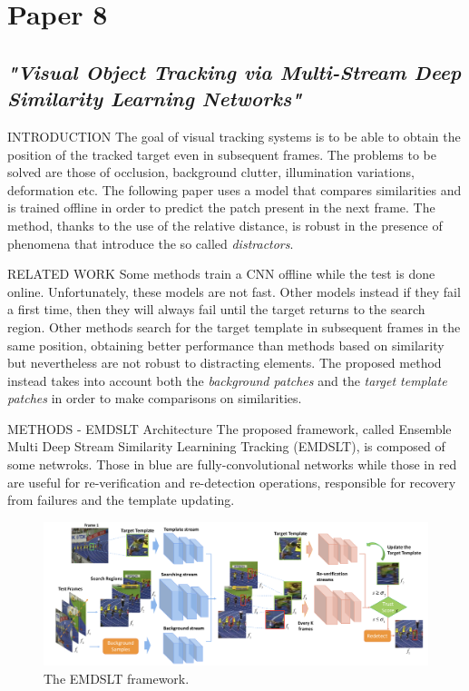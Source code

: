\section{Paper 8}
\subsection{\emph{"Visual Object Tracking via Multi-Stream Deep Similarity Learning Networks"}}

\begin{frame}{INTRODUCTION}
    The goal of visual tracking systems is to be able to obtain the position of 
    the tracked target even in subsequent frames. The problems to be solved 
    are those of occlusion, background clutter, illumination variations, 
    deformation etc. The following paper uses a model that compares 
    similarities and is trained offline in order to predict the patch present in 
    the next frame. The method, thanks to the use of the relative distance, 
    is robust in the presence of phenomena that introduce the so called 
    \emph{distractors}.
\end{frame}

\begin{frame}{RELATED WORK}
    Some methods train a CNN offline while the test is done online. Unfortunately, 
    these models are not fast. Other models instead if they fail a first 
    time, then they will always fail until the target returns to the search region. 
    Other methods   search for the target template in subsequent frames 
    in the same position, obtaining better performance than methods based on 
    similarity but nevertheless are not robust to distracting elements. The proposed 
    method instead takes into account both the \emph{background patches} and 
    the \emph{target template patches} in order to make comparisons on similarities.
\end{frame}

\begin{frame}{METHODS - EMDSLT Architecture}
    The proposed framework, called Ensemble Multi Deep Stream Similarity 
    Learnining Tracking (EMDSLT), is composed of some netwroks. Those 
    in blue are fully-convolutional networks while those in red are useful for 
    re-verification and re-detection operations, responsible for recovery from 
    failures and the template updating.
    \begin{figure}[h!]
        \centering
        \includegraphics[width = \linewidth]{images/paper8/EMDSLT.png}
        \centering
        \caption{The EMDSLT framework.}
        \label{fig:EMDSLT}
    \end{figure}
\end{frame}

